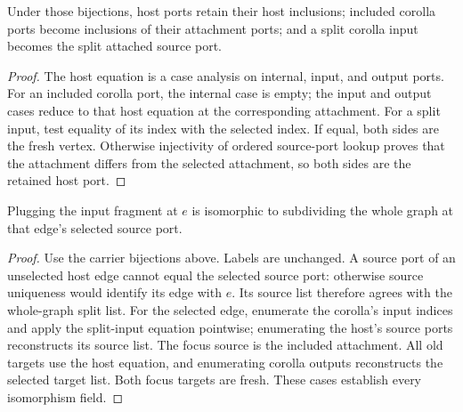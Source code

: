 \begin{lemma}
Under those bijections, host ports retain their host inclusions; included
corolla ports become inclusions of their attachment ports; and a split corolla
input becomes the split attached source port.
\end{lemma}
\begin{proof}
The host equation is a case analysis on internal, input, and output ports.
For an included corolla port, the internal case is empty; the input and output
cases reduce to that host equation at the corresponding attachment. For a
split input, test equality of its index with the selected index. If equal,
both sides are the fresh vertex. Otherwise injectivity of ordered source-port
lookup proves that the attachment differs from the selected attachment, so
both sides are the retained host port.
\end{proof}
\begin{theorem}
Plugging the input fragment at $e$ is isomorphic to subdividing the whole graph
at that edge's selected source port.
\end{theorem}
\begin{proof}
Use the carrier bijections above. Labels are unchanged. A source port of an
unselected host edge cannot equal the selected source port: otherwise source
uniqueness would identify its edge with $e$. Its source list therefore agrees
with the whole-graph split list. For the selected edge, enumerate the corolla's
input indices and apply the split-input equation pointwise; enumerating the
host's source ports reconstructs its source list. The focus source is the
included attachment. All old targets use the host equation, and enumerating
corolla outputs reconstructs the selected target list. Both focus targets are
fresh. These cases establish every isomorphism field.
\end{proof}

